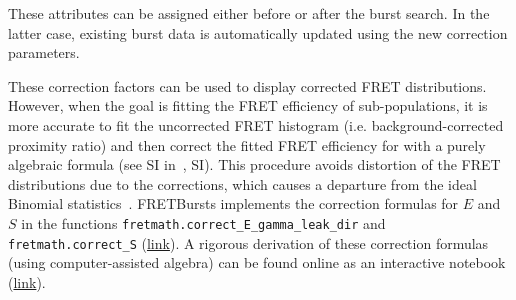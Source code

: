 These attributes can be assigned either before or after the burst search. In the
latter case, existing burst data is automatically updated using the new
correction parameters.

These correction factors can be used to display corrected FRET distributions.
However, when the goal is fitting the FRET efficiency of sub-populations, 
it is more accurate to fit the uncorrected FRET histogram (i.e. background-corrected
proximity ratio) and then correct the fitted FRET efficiency for with a purely
algebraic formula (see SI in~\cite{Lee_2005}, SI). This procedure avoids 
distortion of the FRET distributions due to the corrections, which causes
a departure from the ideal Binomial statistics~\cite{Gopich_2007}.
FRETBursts implements the correction formulas for $E$ and $S$ in the functions
\verb|fretmath.correct_E_gamma_leak_dir| and \verb|fretmath.correct_S|
(\href{http://fretbursts.readthedocs.org/en/latest/fretmath.html}{link}). 
A rigorous derivation of these correction formulas (using computer-assisted algebra) 
can be found online as an interactive notebook (\href{http://nbviewer.jupyter.org/github/tritemio/notebooks/blob/master/Derivation%20of%20FRET%20and%20S%20correction%20formulas.ipynb}{link}).
